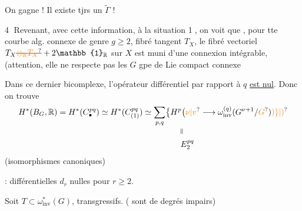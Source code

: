 On gagne ! Il existe tjrs un $\widetilde\Gamma$ !

\textcircled{4} Revenant, avec cette information, à la situation \textcircled{1}, on voit que , pour tte courbe alg.  connexe de genre $g\geq2$, fibré tangent $T_X$, le fibré vectoriel  $T_X\deleted{\unsure{\otimes_{\mathbb R}T_X}}+2\mathbb{1}_{\mathbb R}$ sur $X$ est muni d'une connexion intégrable, (attention, elle ne respecte pas les
$G$ gpe de Lie compact connexe


Dans ce dernier bicomplexe, l'opérateur différentiel par rapport à $q$ \uline{est nul}. Donc on trouve
\[
\begin{aligned}
H^*(B_G,\mathbb R)&=H^*(C_{\bullet}^{pq})\simeq H^*(C_{(1)}^{pq})
\simeq\sum_{p,q}\bigl\{H^p\bigl(\unsure{\nu|v}\longrightarrow
\omega_{\mathrm{inv}}^{(q)}(G^{\nu+1}/\unsure{G})\unsure{)\}|)}\\[-2pt]
&\hspace{15em}\rotatebox{90}{$=$}\\
&\hspace{15em}E_2^{pq}
\end{aligned}
\]
(isomorphismes canoniques)

 : différentielles $d_r$ nulles pour $r\geq2$.

Soit $T\subset\omega^*_{\mathrm{inv}}(G)$,  transgressifs. ( sont de degrés impairs)

